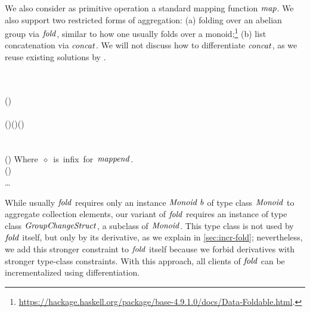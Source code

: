 We also consider as primitive operation a standard mapping function \ensuremath{\Varid{map}}.
We also support two restricted forms of aggregation:
(a) folding over an abelian group via
\ensuremath{\Varid{fold}}, similar to how one usually folds over a monoid;\footnote{\url{https://hackage.haskell.org/package/base-4.9.1.0/docs/Data-Foldable.html}.}
(b) list concatenation via \ensuremath{\Varid{concat}}. We will not discuss how to differentiate
\ensuremath{\Varid{concat}}, as we reuse existing solutions by \citet{Firsov2016purely}.
\begin{hscode}\SaveRestoreHook
{}%
%
\>[B]{}\mathrel{:\mkern-1mu:}\to {}\;\<[E]%
\\
\>[B]{}\;\mathrel{=}\;\;\<[E]%
\\[\blanklineskip]%
\>[B]{}\mathrel{:\mkern-1mu:}(\to {})\to {}\;\to {}\;\<[E]%
\\
\>[B]{}\;\;\mathrel{=}\<[E]%
\\
\>[B]{}\;\;(\;\;)\mathrel{=}\;(\;)\;(\;\;){}\<[E]%
\\[\blanklineskip]%
\>[B]{}\mathrel{:\mkern-1mu:}\;\Rightarrow{}\;\to {}\<[E]%
\\
\>[B]{}\;\mathrel{=}\<[E]%
\\
\>[B]{}\;(\;\;)\mathrel{=} \diamond {}\;\mbox{\onelinecomment  Where \ensuremath{ \diamond } is infix for \ensuremath{\Varid{mappend}}.}{}\<[E]%
\\[\blanklineskip]%
\>[B]{}\mathrel{:\mkern-1mu:}\;(\;)\to {}\;\<[E]%
\\
\>[B]{}\mathrel{=}\ldots{}\<[E]%
\ColumnHook
\end{hscode}\resethooks
While usually \ensuremath{\Varid{fold}} requires only an instance \ensuremath{\Conid{Monoid}\;\Varid{b}} of type class \ensuremath{\Conid{Monoid}} to aggregate
collection elements, our variant of \ensuremath{\Varid{fold}} requires an instance of type class \ensuremath{\Conid{GroupChangeStruct}}, a
subclass of \ensuremath{\Conid{Monoid}}. This type class is not used by \ensuremath{\Varid{fold}} itself, but only by
its derivative, as we explain in \cref{sec:incr-fold}; nevertheless,
we add this stronger constraint to \ensuremath{\Varid{fold}} itself because we forbid derivatives
with stronger type-class constraints. With this approach, all clients of \ensuremath{\Varid{fold}}
can be incrementalized using differentiation.

